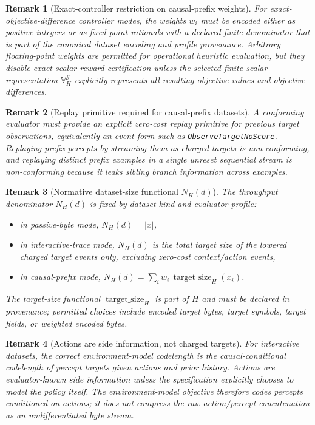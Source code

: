 \documentclass[11pt]{article}
\newtheorem{remark}{Remark}
\begin{document}
\begin{remark}[Exact-controller restriction on causal-prefix weights]
For exact-objective-difference controller modes, the weights $w_i$ must be
encoded either as positive integers or as fixed-point rationals with a declared
finite denominator that is part of the canonical dataset encoding and profile
provenance. Arbitrary floating-point weights are permitted for operational
heuristic evaluation, but they disable exact scalar reward certification unless
the selected finite scalar representation $\mathbb{V}_H^{\mathcal J}$
explicitly represents all resulting objective values and objective
differences.
\end{remark}

\begin{remark}[Replay primitive required for causal-prefix datasets]
A conforming evaluator must provide an explicit zero-cost replay primitive for
previous target observations, equivalently an event form such as
\texttt{ObserveTargetNoScore}. Replaying prefix percepts by streaming them as
charged targets is non-conforming, and replaying distinct prefix examples in a
single unreset sequential stream is non-conforming because it leaks sibling
branch information across examples.
\end{remark}

\begin{remark}[Normative dataset-size functional $N_H(d)$]
The throughput denominator $N_H(d)$ is fixed by dataset kind and evaluator
profile:
\begin{itemize}
    \item in passive-byte mode, $N_H(d)=|x|$,
    \item in interactive-trace mode, $N_H(d)$ is the total target size of the
    lowered charged target events only, excluding zero-cost context/action
    events,
    \item in causal-prefix mode,
    $N_H(d)=\sum_i w_i\,\operatorname{target\_size}_H(x_i)$.
\end{itemize}
The target-size functional $\operatorname{target\_size}_H$ is part of $H$ and
must be declared in provenance; permitted choices include encoded target bytes,
target symbols, target fields, or weighted encoded bytes.
\end{remark}

\begin{remark}[Actions are side information, not charged targets]
For interactive datasets, the correct environment-model codelength is the
causal-conditional codelength of percept targets given actions and prior
history. Actions are evaluator-known side information unless the specification
explicitly chooses to model the policy itself. The environment-model objective
therefore codes percepts conditioned on actions; it does not compress the raw
action/percept concatenation as an undifferentiated byte stream.
\end{remark}
\end{document}
